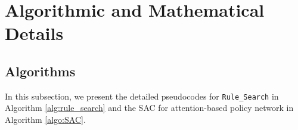  




 





 
























\section{Algorithmic and Mathematical Details}


\subsection{Algorithms}\label{Sec:algo_appendix}

In this subsection, we present the detailed pseudocodes for \texttt{Rule\_Search} in Algorithm \ref{alg:rule_search} and the SAC for attention-based policy network in Algorithm \ref{algo:SAC}.

 



